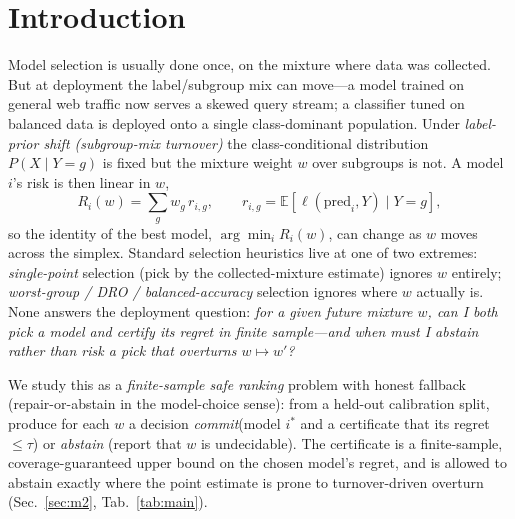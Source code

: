 \documentclass{article}
\begin{document}
\section{Introduction}
\label{sec:intro}

Model selection is usually done once, on the mixture where data was collected. But at
deployment the label/subgroup mix can move---a model trained on general web traffic now
serves a skewed query stream; a classifier tuned on balanced data is deployed onto a single
class-dominant population. Under \emph{label-prior shift (subgroup-mix turnover)} the
class-conditional distribution $P(X\mid Y{=}g)$ is fixed but the mixture weight $w$ over
subgroups is not. A model $i$'s risk is then linear in $w$,
\begin{equation}
  R_i(w)=\sum_{g} w_g\, r_{i,g},\qquad r_{i,g}=\mathbb{E}[\ell(\text{pred}_i, Y)\mid Y{=}g],
  \label{eq:linear}
\end{equation}
so the identity of the best model, $\arg\min_i R_i(w)$, can change as $w$ moves across the
simplex. Standard selection heuristics live at one of two extremes: \emph{single-point}
selection (pick by the collected-mixture estimate) ignores $w$ entirely; \emph{worst-group /
DRO / balanced-accuracy} selection ignores where $w$ actually is. None answers the
deployment question: \emph{for a given future mixture $w$, can I both pick a model and
certify its regret in finite sample---and when must I abstain rather than risk a pick that
overturns $w\mapsto w'$?}

We study this as a \emph{finite-sample safe ranking} problem with honest fallback
(repair-or-abstain in the model-choice sense): from a held-out calibration split, produce
for each $w$ a decision \emph{commit}(model $i^*$ and a certificate that its regret
$\le\tau$) or \emph{abstain} (report that $w$ is undecidable). The certificate is a
finite-sample, coverage-guaranteed upper bound on the chosen model's regret, and is allowed
to abstain exactly where the point estimate is prone to turnover-driven overturn
(Sec.~\ref{sec:m2}, Tab.~\ref{tab:main}).
\end{document}

